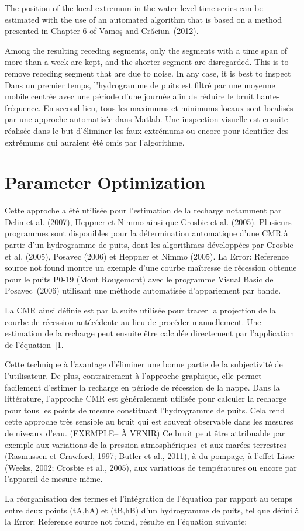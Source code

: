 \documentclass[WHATMANUAL.tex]{subfiles}
\begin{document}
The position of the local extremum in the water level time series can be estimated with the use of an automated algorithm that is based on a method presented in Chapter 6 of Vamoş and Crăciun (2012).


Among the resulting receding segments, only the segments with a time span of more than a week are kept, and the shorter segment are disregarded. This is to remove receding segment that are due to noise.  In any case, it is best to inspect 
Dans un premier temps, l'hydrogramme de puits est filtré par une moyenne mobile centrée avec une période d'une journée afin de réduire le bruit haute-fréquence. En second lieu, tous les maximums et minimums locaux sont localisés par une approche automatisée dans Matlab. Une inspection visuelle est ensuite réalisée dans le but d'éliminer les faux extrémums ou encore pour identifier des extrémums qui auraient été omis par l'algorithme.

\section{Parameter Optimization}

Cette approche a été utilisée pour l'estimation de la recharge notamment par Delin et al. (2007), Heppner et Nimmo ainsi que Crosbie et al. (2005). Plusieurs programmes sont disponibles pour la détermination automatique d'une CMR à partir d'un hydrogramme de puits, dont les algorithmes développées par Crosbie et al. (2005), Posavec (2006) et Heppner et Nimmo (2005). 
La Error: Reference source not found montre un exemple d'une courbe maîtresse de récession obtenue pour le puits P0-19 (Mont Rougemont) avec le programme Visual Basic de Posavec (2006) utilisant une méthode automatisée d'appariement par bande.

La CMR ainsi définie est par la suite utilisée pour tracer la projection de la courbe de récession antécédente au lieu de procéder manuellement. Une estimation de la recharge peut ensuite être calculée directement par l'application de l'équation [1.

Cette technique à l'avantage d'éliminer une bonne partie de la subjectivité de l'utilisateur. De plus, contrairement à l'approche graphique, elle permet facilement d'estimer la recharge en période de récession de la nappe. Dans la littérature, l'approche CMR est généralement utilisée pour calculer la recharge pour tous les points de mesure constituant l'hydrogramme de puits. Cela rend cette approche très sensible au bruit qui est souvent observable dans les mesures de niveaux d'eau. (EXEMPLE– À VENIR) Ce bruit peut être attribuable par exemple aux variations de la pression atmosphériques et aux marées terrestres (Rasmussen et Crawford, 1997; Butler et al., 2011), à du pompage, à l'effet Lisse (Weeks, 2002; Crosbie et al., 2005), aux variations de températures ou encore par l'appareil de mesure même.

La réorganisation des termes et l’intégration de l’équation
 par rapport au temps entre deux points (tA,hA) et (tB,hB) d'un hydrogramme de puits, tel que défini à la Error: Reference source not found, résulte en l’équation suivante:
\end{document}

